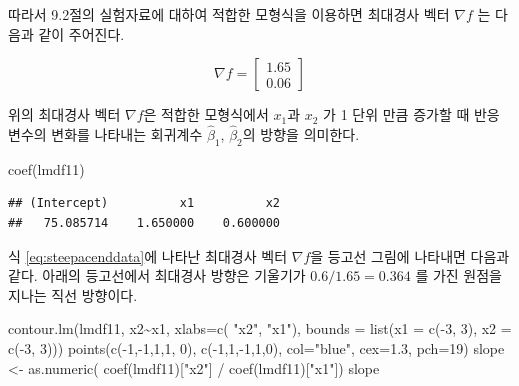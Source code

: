 \documentclass[
]{book}
\newenvironment{Shaded}{\begin{snugshade}}{\end{snugshade}}
\newcommand{\AttributeTok}[1]{\textcolor[rgb]{0.77,0.63,0.00}{#1}}
\newcommand{\DecValTok}[1]{\textcolor[rgb]{0.00,0.00,0.81}{#1}}
\newcommand{\FloatTok}[1]{\textcolor[rgb]{0.00,0.00,0.81}{#1}}
\newcommand{\FunctionTok}[1]{\textcolor[rgb]{0.00,0.00,0.00}{#1}}
\newcommand{\NormalTok}[1]{#1}
\newcommand{\OtherTok}[1]{\textcolor[rgb]{0.56,0.35,0.01}{#1}}
\newcommand{\SpecialCharTok}[1]{\textcolor[rgb]{0.00,0.00,0.00}{#1}}
\newcommand{\StringTok}[1]{\textcolor[rgb]{0.31,0.60,0.02}{#1}}
\theoremstyle{definition}
\theoremstyle{definition}
\theoremstyle{definition}
\theoremstyle{definition}
\theoremstyle{remark}
\begin{document}
따라서 9.2절의 실험자료에 대하여 적합한 모형식을 이용하면 최대경사 벡터 \(\nabla f\) 는 다음과 같이 주어진다.

\begin{equation}
\nabla f = 
\begin{bmatrix} 
1.65  \\
0.06 
\end{bmatrix}
\label{eq:steepacenddata}
\end{equation}

위의 최대경사 벡터 \(\nabla f\)은 적합한 모형식에서 \(x_1\)과 \(x_2\) 가 1 단위 만큼 증가할 때 반응변수의 변화를 나타내는 회귀계수 \(\hat \beta_1\), \(\hat \beta_2\)의 방향을 의미한다.

\begin{Shaded}
\begin{Highlighting}[]
\FunctionTok{coef}\NormalTok{(lmdf11)}
\end{Highlighting}
\end{Shaded}

\begin{verbatim}
## (Intercept)          x1          x2 
##   75.085714    1.650000    0.600000
\end{verbatim}

식 \eqref{eq:steepacenddata}에 나타난 최대경사 벡터 \(\nabla f\)을 등고선 그림에 나타내면 다음과 같다. 아래의 등고선에서
최대경사 방향은 기울기가 \(0.6/1.65=0.364\) 를 가진 원점을 지나는 직선 방향이다.

\begin{Shaded}
\begin{Highlighting}[]
\FunctionTok{contour.lm}\NormalTok{(lmdf11, x2}\SpecialCharTok{\textasciitilde{}}\NormalTok{x1, }\AttributeTok{xlabs=}\FunctionTok{c}\NormalTok{( }\StringTok{"x2"}\NormalTok{, }\StringTok{"x1"}\NormalTok{), }\AttributeTok{bounds =} \FunctionTok{list}\NormalTok{(}\AttributeTok{x1 =} \FunctionTok{c}\NormalTok{(}\SpecialCharTok{{-}}\DecValTok{3}\NormalTok{, }\DecValTok{3}\NormalTok{), }\AttributeTok{x2 =} \FunctionTok{c}\NormalTok{(}\SpecialCharTok{{-}}\DecValTok{3}\NormalTok{, }\DecValTok{3}\NormalTok{)))}
\FunctionTok{points}\NormalTok{(}\FunctionTok{c}\NormalTok{(}\SpecialCharTok{{-}}\DecValTok{1}\NormalTok{,}\SpecialCharTok{{-}}\DecValTok{1}\NormalTok{,}\DecValTok{1}\NormalTok{,}\DecValTok{1}\NormalTok{, }\DecValTok{0}\NormalTok{), }\FunctionTok{c}\NormalTok{(}\SpecialCharTok{{-}}\DecValTok{1}\NormalTok{,}\DecValTok{1}\NormalTok{,}\SpecialCharTok{{-}}\DecValTok{1}\NormalTok{,}\DecValTok{1}\NormalTok{,}\DecValTok{0}\NormalTok{), }\AttributeTok{col=}\StringTok{"blue"}\NormalTok{, }\AttributeTok{cex=}\FloatTok{1.3}\NormalTok{, }\AttributeTok{pch=}\DecValTok{19}\NormalTok{)}
\NormalTok{slope }\OtherTok{\textless{}{-}} \FunctionTok{as.numeric}\NormalTok{( }\FunctionTok{coef}\NormalTok{(lmdf11)[}\StringTok{"x2"}\NormalTok{] }\SpecialCharTok{/} \FunctionTok{coef}\NormalTok{(lmdf11)[}\StringTok{"x1"}\NormalTok{])}
\NormalTok{slope}
\end{Highlighting}
\end{Shaded}
\end{document}
